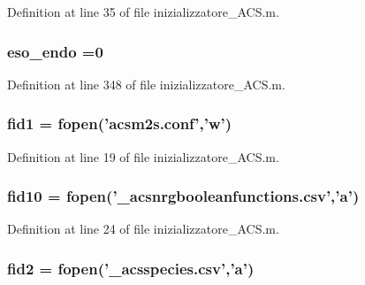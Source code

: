 Definition at line 35 of file inizializzatore\-\_\-\-A\-C\-S.\-m.

\hypertarget{a00068_aad3b1a68f41f4a6fa247c1cf8e1d450a}{
\subsubsection[{eso\-\_\-endo}]{ eso\-\_\-endo =0}}\label{a00068_aad3b1a68f41f4a6fa247c1cf8e1d450a}


Definition at line 348 of file inizializzatore\-\_\-\-A\-C\-S.\-m.

\hypertarget{a00068_aff1e821fc5f97a0758f74b5cbd00cacf}{
\subsubsection[{fid1}]{\setlength{\rightskip}{0pt plus 5cm}fid1 = fopen('acsm2s.\-conf','w')}}\label{a00068_aff1e821fc5f97a0758f74b5cbd00cacf}


Definition at line 19 of file inizializzatore\-\_\-\-A\-C\-S.\-m.

\hypertarget{a00068_aadad4fd2d661ea2b9f0c3a95e3f7b4ba}{
\subsubsection[{fid10}]{\setlength{\rightskip}{0pt plus 5cm}fid10 = fopen('\-\_\-acsnrgbooleanfunctions.\-csv','{\bf a}')}}\label{a00068_aadad4fd2d661ea2b9f0c3a95e3f7b4ba}


Definition at line 24 of file inizializzatore\-\_\-\-A\-C\-S.\-m.

\hypertarget{a00068_a11af2c31c7926441f43875d99b4577d2}{
\subsubsection[{fid2}]{\setlength{\rightskip}{0pt plus 5cm}fid2 = fopen('\-\_\-acsspecies.\-csv','{\bf a}')}}\label{a00068_a11af2c31c7926441f43875d99b4577d2}


